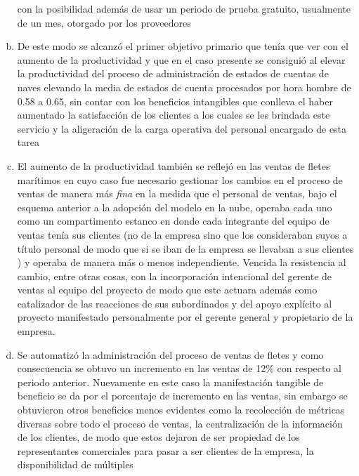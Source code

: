 \begin{enumerate}[a.]
          con la posibilidad además de usar un periodo de prueba gratuito,
          usualmente de un mes, otorgado por los proveedores
    \item De este modo se alcanzó el primer objetivo primario que tenía que
          ver con el aumento de la productividad y que en el caso presente se
          consiguió al elevar la productividad del proceso de administración
          de estados de cuentas de naves elevando la media de estados de cuenta
          procesados por hora hombre de 0.58 a 0.65, sin contar con los beneficios
          intangibles que conlleva el haber aumentado la satisfacción de los
          clientes a los cuales se les brindada este servicio y la aligeración
          de la carga operativa del personal encargado de esta tarea
    \item El aumento de la productividad también se reflejó en las ventas de
          fletes marítimos en cuyo caso fue necesario gestionar los cambios en
          el proceso de ventas de manera más \emph{fina} en la medida que el personal
          de ventas, bajo el esquema anterior a la adopción del modelo en la
          nube, operaba cada uno como un compartimento estanco en donde cada
          integrante del equipo de ventas tenía sus clientes (no de la empresa
          sino que los consideraban suyos a título personal de modo que si se
          iban de la empresa se llevaban a sus clientes ) y operaba de manera
          más o menos independiente. Vencida la resistencia al cambio, entre
          otras cosas, con la incorporación intencional del gerente de ventas
          al equipo del proyecto de modo que este actuara además como catalizador
          de las reacciones de sus subordinados y del apoyo explícito al
          proyecto manifestado personalmente por el gerente general y propietario
          de la empresa.
    \item Se automatizó la administración del proceso de ventas de fletes y
          como consecuencia se obtuvo un incremento en las ventas de 12\% con
          respecto al periodo anterior. Nuevamente en este caso la manifestación
          tangible de beneficio se da por el porcentaje de incremento en las ventas,
          sin embargo se obtuvieron otros beneficios menos evidentes como la
          recolección de métricas diversas sobre todo el proceso de ventas,
          la centralización de la información de los clientes, de modo que
          estos dejaron de ser propiedad de los representantes comerciales para
          pasar a ser clientes de la empresa, la disponibilidad de múltiples

\end{enumerate}
